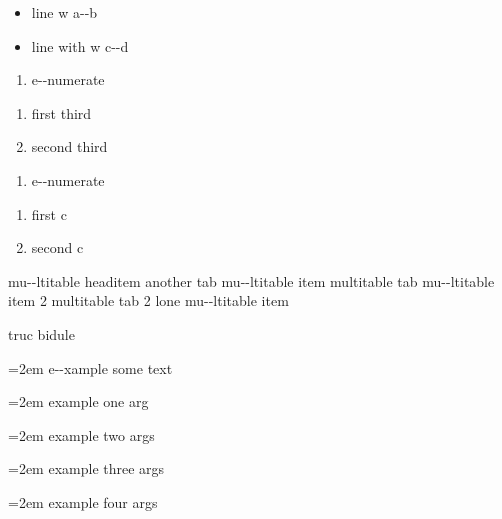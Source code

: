 \documentclass{book}
\begin{document}
\begin{itemize}[label=\hbox{} on a line]
\item line w a{-}{-}b
\item line with w c{-}{-}d
\end{itemize}

\begin{enumerate}[start=1]
\item e{-}{-}numerate
\end{enumerate}

\begin{enumerate}[start=3]
\item first third
\item second third
\end{enumerate}

\begin{enumerate}[label=\alph*.]
\item e{-}{-}numerate
\end{enumerate}

\begin{enumerate}[label=\alph*.,start=3]
\item first c
\item second c
\end{enumerate}

mu{-}{-}ltitable headitem another tab
mu{-}{-}ltitable item multitable tab
mu{-}{-}ltitable item 2 multitable tab 2
%
lone mu{-}{-}ltitable item

truc bidule

\par\begingroup\obeylines\obeyspaces\frenchspacing\leftskip=2em\relax\parskip=0pt\relax\ttfamily{}%
e{-}{-}xample  some
   text
\endgroup{}%

\par\begingroup\obeylines\obeyspaces\frenchspacing\leftskip=2em\relax\parskip=0pt\relax\ttfamily{}%
example one arg
\endgroup{}%

\par\begingroup\obeylines\obeyspaces\frenchspacing\leftskip=2em\relax\parskip=0pt\relax\ttfamily{}%
example two args
\endgroup{}%

\par\begingroup\obeylines\obeyspaces\frenchspacing\leftskip=2em\relax\parskip=0pt\relax\ttfamily{}%
example three args
\endgroup{}%

\par\begingroup\obeylines\obeyspaces\frenchspacing\leftskip=2em\relax\parskip=0pt\relax\ttfamily{}%
example four args
\endgroup{}%
\end{document}
